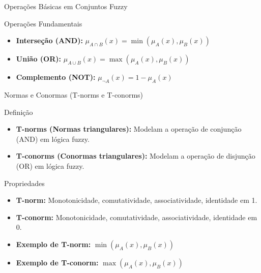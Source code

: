 \documentclass[aspectratio=169]{beamer}
\begin{document}
\begin{frame}{Operações Básicas em Conjuntos Fuzzy}
\footnotesize
    \begin{block}{Operações Fundamentais}
        \begin{itemize}
            \item \textbf{Interseção (AND):} \( \mu_{A \cap B}(x) = \min(\mu_A(x), \mu_B(x)) \)
            \item \textbf{União (OR):} \( \mu_{A \cup B}(x) = \max(\mu_A(x), \mu_B(x)) \)
            \item \textbf{Complemento (NOT):} \( \mu_{\neg A}(x) = 1 - \mu_A(x) \)
        \end{itemize}
    \end{block}
    \centering
\end{frame}

\begin{frame}{Normas e Conormas (T-norms e T-conorms)}
\footnotesize
    \begin{block}{Definição}
        \begin{itemize}
            \item \textbf{T-norms (Normas triangulares):} Modelam a operação de conjunção (AND) em lógica fuzzy.
            \item \textbf{T-conorms (Conormas triangulares):} Modelam a operação de disjunção (OR) em lógica fuzzy.
        \end{itemize}
    \end{block}
    \pause
    \begin{block}{Propriedades}
        \begin{itemize}
            \item \textbf{T-norm:} Monotonicidade, comutatividade, associatividade, identidade em 1.
            \item \textbf{T-conorm:} Monotonicidade, comutatividade, associatividade, identidade em 0.
        \end{itemize}
    \end{block}
    \pause
    \centering
    \begin{itemize}
        \item \textbf{Exemplo de T-norm:} \( \min(\mu_A(x), \mu_B(x)) \)
        \item \textbf{Exemplo de T-conorm:} \( \max(\mu_A(x), \mu_B(x)) \)
    \end{itemize}
\end{frame}
\end{document}
